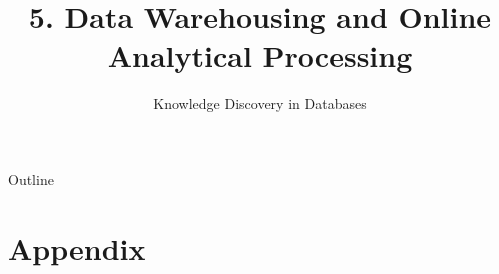 \documentclass[aspectratio=169,t,table]{beamer}
\title[KDD~5.~OLAP]{5. Data Warehousing and Online Analytical Processing} %
\subtitle{Knowledge Discovery in Databases}
\begin{document}
\maketitle

{ %
	\begin{frame}[noframenumbering]{Outline}
		\tableofcontents

	\end{frame}
}







\section{Appendix}
\appendix


\end{document}
